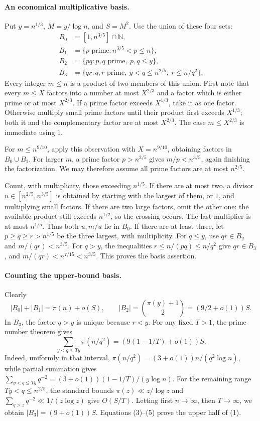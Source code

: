 \paragraph{An economical multiplicative basis.}
Put \(y=n^{1/3}\), \(M=y/\log n\), and \(S=M^2\).
Use the union of these four sets:
\[
 \begin{split}
 B_0&=[1,n^{3/5}]\cap\mathbb N,\\
 B_1&=\{p\text{ prime}:n^{3/5}<p\leq n\},\\
 B_2&=\{pq:p,q\text{ prime},\ p,q\leq y\},\\
 B_3&=\{qr:q,r\text{ prime},\ y<q\leq n^{2/5},\
                                      r\leq n/q^2\}.
 \end{split}                                                   \tag{4}
\]
Every integer \(m\leq n\) is a product of two members of this union.
First note that every \(m\leq X\) factors into a number at
most \(X^{2/3}\) and a factor which is either prime or at
most \(X^{2/3}\).
If a prime factor exceeds \(X^{1/3}\), take it as one factor.
Otherwise multiply small prime factors until their product
first exceeds \(X^{1/3}\); both it and the complementary
factor are at most \(X^{2/3}\).
The case \(m\leq X^{2/3}\) is immediate using \(1\).

For \(m\leq n^{9/10}\), apply this observation with
\(X=n^{9/10}\), obtaining factors in \(B_0\cup B_1\).
For larger \(m\), a prime factor \(p>n^{2/5}\) gives
\(m/p<n^{3/5}\), again finishing the factorization.
We may therefore assume all prime factors are at most \(n^{2/5}\).

Count, with multiplicity, those exceeding \(n^{1/5}\).
If there are at most two, a divisor
\(u\in[n^{2/5},n^{3/5}]\) is obtained by starting with
the largest of them, or \(1\), and multiplying small factors.
If there are two large factors, omit the other one:
the available product still exceeds \(n^{1/2}\), so the
crossing occurs. The last multiplier is at most \(n^{1/5}\).
Thus both \(u,m/u\) lie in \(B_0\).
If there are at least three, let \(p\geq q\geq r>n^{1/5}\)
be the three largest, with multiplicity.
For \(q\leq y\), use \(qr\in B_2\) and \(m/(qr)<n^{3/5}\).
For \(q>y\), the inequalities
\(r\leq n/(pq)\leq n/q^2\) give \(qr\in B_3\), and
\(m/(qr)<n^{7/15}<n^{3/5}\).
This proves the basis assertion.

\paragraph{Counting the upper-bound basis.}
Clearly
\[
 |B_0|+|B_1|=\pi(n)+o(S),\qquad
 |B_2|=\binom{\pi(y)+1}{2}=(9/2+o(1))S.
\]
In \(B_3\), the factor \(q>y\) is unique because \(r<y\).
For any fixed \(T>1\), the prime number theorem gives
\[
 \sum_{y<q\leq Ty}\pi(n/q^2)
 =\left(9(1-1/T)+o(1)\right)S.                                \tag{5}
\]
Indeed, uniformly in that interval,
\(\pi(n/q^2)=(3+o(1))n/(q^2\log n)\), while partial summation
gives
\(\sum_{y<q\leq Ty}q^{-2}
 =(3+o(1))(1-1/T)/(y\log n)\).
For the remaining range \(Ty<q\leq n^{2/5}\), the standard
bounds \(\pi(z)\ll z/\log z\) and
\(\sum_{q>z}q^{-2}\ll1/(z\log z)\) give \(O(S/T)\).
Letting first \(n\to\infty\), then \(T\to\infty\),
we obtain \(|B_3|=(9+o(1))S\).
Equations (3)--(5) prove the upper half of (1).

